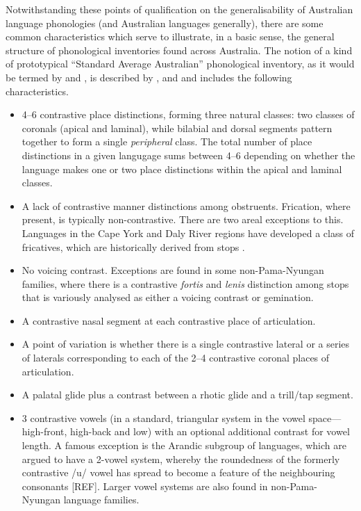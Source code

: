 Notwithstanding these points of qualification on the generalisability of Australian language phonologies (and Australian languages generally), there are some common characteristics which serve to illustrate, in a basic sense, the general structure of phonological inventories found across Australia. The notion of a kind of prototypical ``Standard Average Australian'' phonological inventory, as it would be termed by \textcite{gasser_revisiting_2014} and \textcite{bowern_standard_2017}, is described by \textcite{dixon_languages_1980}, \textcite{hamilton_phonetic_1996} and \textcite{fletcher_sound_2014} and includes the following characteristics.

\begin{itemize}
\tightlist
\item
  4--6 contrastive place distinctions, forming three natural classes: two classes of coronals (apical and laminal), while bilabial and dorsal segments pattern together to form a single \emph{peripheral} class. The total number of place distinctions in a given langugage sums between 4--6 depending on whether the language makes one or two place distinctions within the apical and laminal classes.
\item
  A lack of contrastive manner distinctions among obstruents. Frication, where present, is typically non-contrastive. There are two areal exceptions to this. Languages in the Cape York and Daly River regions have developed a class of fricatives, which are historically derived from stops \autocite[p.~125]{dixon_languages_1980}.
\item
  No voicing contrast. Exceptions are found in some non-Pama-Nyungan families, where there is a contrastive \emph{fortis} and \emph{lenis} distinction among stops that is variously analysed as either a voicing contrast or gemination.
\item
  A contrastive nasal segment at each contrastive place of articulation.
\item
  A point of variation is whether there is a single contrastive lateral or a series of laterals corresponding to each of the 2--4 contrastive coronal places of articulation.
\item
  A palatal glide plus a contrast between a rhotic glide and a trill/tap segment.
\item
  3 contrastive vowels (in a standard, triangular system in the vowel space---high-front, high-back and low) with an optional additional contrast for vowel length. A famous exception is the Arandic subgroup of languages, which are argued to have a 2-vowel system, whereby the roundedness of the formerly contrastive /u/ vowel has spread to become a feature of the neighbouring consonants {[}REF{]}. Larger vowel systems are also found in non-Pama-Nyungan language families.
\end{itemize}

